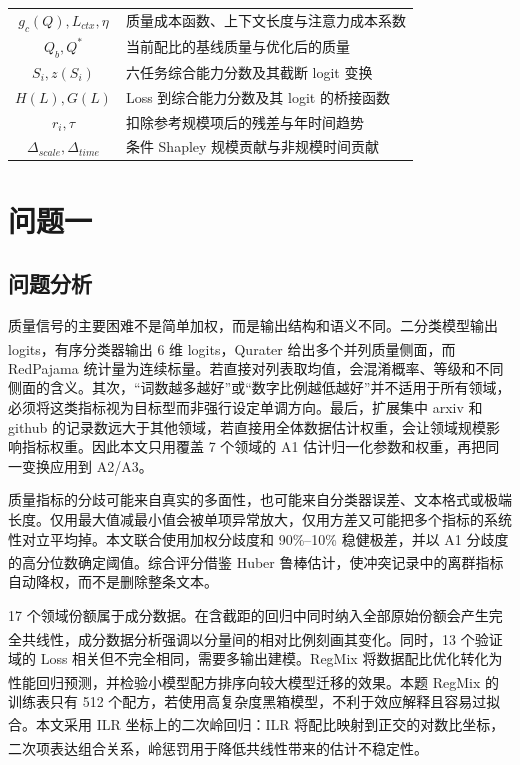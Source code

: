 \documentclass[bwprint]{gmcmthesis}
\numberwithin{equation}{section}
\numberwithin{figure}{section}
\numberwithin{table}{section}
\begin{document}
\begin{xltabular}{0.92\textwidth}{cX}
    $g_c(Q),L_{ctx},\eta$ & 质量成本函数、上下文长度与注意力成本系数 \\
    $Q_b,Q^*$ & 当前配比的基线质量与优化后的质量 \\
    $S_i,z(S_i)$ & 六任务综合能力分数及其截断 logit 变换 \\
    $H(L),G(L)$ & Loss 到综合能力分数及其 logit 的桥接函数 \\
    $r_i,\tau$ & 扣除参考规模项后的残差与年时间趋势 \\
    $\Delta_{scale},\Delta_{time}$ & 条件 Shapley 规模贡献与非规模时间贡献 \\
\end{xltabular}



\section{问题一}   %
    \subsection{问题分析}   %
    质量信号的主要困难不是简单加权，而是输出结构和语义不同。二分类模型输出 logits，有序分类器输出 6 维 logits，Qurater 给出多个并列质量侧面\textsuperscript{\cite{wettig2024qurating}}，而 RedPajama 统计量为连续标量。若直接对列表取均值，会混淆概率、等级和不同侧面的含义。其次，``词数越多越好''或``数字比例越低越好''并不适用于所有领域，必须将这类指标视为目标型而非强行设定单调方向。最后，扩展集中 arxiv 和 github 的记录数远大于其他领域，若直接用全体数据估计权重，会让领域规模影响指标权重。因此本文只用覆盖 7 个领域的 A1 估计归一化参数和权重，再把同一变换应用到 A2/A3。

    质量指标的分歧可能来自真实的多面性，也可能来自分类器误差、文本格式或极端长度。仅用最大值减最小值会被单项异常放大，仅用方差又可能把多个指标的系统性对立平均掉。本文联合使用加权分歧度和 90\%--10\% 稳健极差，并以 A1 分歧度的高分位数确定阈值。综合评分借鉴 Huber 鲁棒估计\textsuperscript{\cite{huber1964robust}}，使冲突记录中的离群指标自动降权，而不是删除整条文本。

    17 个领域份额属于成分数据。在含截距的回归中同时纳入全部原始份额会产生完全共线性，成分数据分析强调以分量间的相对比例刻画其变化\textsuperscript{\cite{aitchison1982compositional}}。同时，13 个验证域的 Loss 相关但不完全相同，需要多输出建模。RegMix 将数据配比优化转化为性能回归预测，并检验小模型配方排序向较大模型迁移的效果\textsuperscript{\cite{liu2025regmix}}。本题 RegMix 的训练表只有 512 个配方，若使用高复杂度黑箱模型，不利于效应解释且容易过拟合。本文采用 ILR 坐标上的二次岭回归：ILR 将配比映射到正交的对数比坐标\textsuperscript{\cite{egozcue2003ilr}}，二次项表达组合关系，岭惩罚用于降低共线性带来的估计不稳定性\textsuperscript{\cite{hoerl1970ridge}}。
\end{document}
